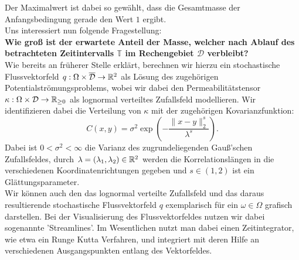 Der Maximalwert ist dabei so gewählt, dass die Gesamtmasse der Anfangsbedingung gerade den Wert $ 1 $ ergibt.\\
Uns interessiert nun folgende Fragestellung: \\
\textbf{Wie groß ist der erwartete Anteil der Masse, welcher nach Ablauf des betrachteten Zeitintervalls $ \mathbb{T} $ im Rechengebiet $ \mathcal{D} $ verbleibt?}\\

Wie bereits an früherer Stelle erklärt, berechnen wir hierzu ein stochastische Flussvektorfeld $ q : \Omega \times \overline{\mathcal{ D}} \to \mathbb{R}^2 $ als Lösung des zugehörigen Potentialströmungsproblems, wobei wir dabei den Permeabilitätstensor $ \kappa : \Omega \times \mathcal{D} \to \mathbb{R}_{\geq0} $ als lognormal verteiltes Zufallsfeld modellieren. Wir identifizieren dabei die Verteilung von $ \kappa $ mit der zugehörigen Kovarianzfunktion:
\[
 C(x,y) = \sigma^2 \exp(- \frac{\lVert x-y \rVert_2^s}{\lambda^s} ) .
\]
Dabei ist $ 0 < \sigma^2 < \infty $ die Varianz des zugrundeliegenden Gauß'schen Zufallsfeldes, durch $ \lambda = (\lambda_1,\lambda_2) \in \mathbb{R}^2 $ werden die Korrelationslängen in die verschiedenen Koordinatenrichtungen gegeben und $ s \in (1,2) $ ist ein Glättungsparameter. \\
Wir können auch den das lognormal verteilte Zufallsfeld und das daraus resultierende stochastische Flussvektorfeld $ q $ exemplarisch für ein $ \omega \in \Omega $ grafisch darstellen. Bei der Visualisierung des Flussvektorfeldes nutzen wir dabei sogenannte 'Streamlines'. Im Wesentlichen nutzt man dabei einen Zeitintegrator, wie etwa ein Runge Kutta Verfahren, und integriert mit deren Hilfe an verschiedenen Ausgangspunkten entlang des Vektorfeldes.

\begin{figure}[H]
	\centering
	
\end{figure}

